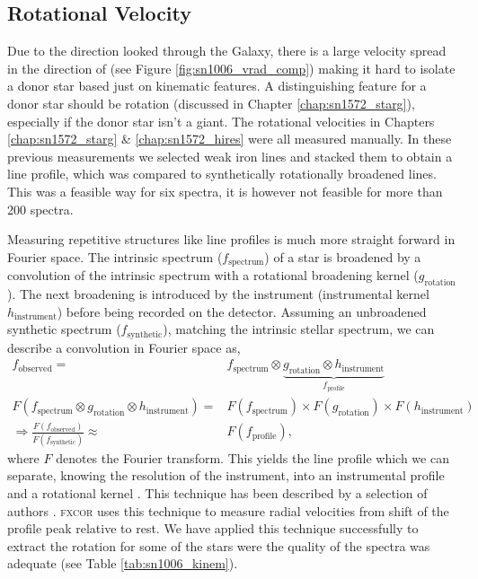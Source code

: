 \subsection{Rotational Velocity}
\label{sec:sn1006_rotvel}
Due to the direction looked through the Galaxy, there is a large velocity spread in the direction of  (see Figure \ref{fig:sn1006_vrad_comp}) making it hard to isolate a \gls{donor} star based just on kinematic features. A distinguishing feature for a \gls{donor} star should be rotation (discussed in Chapter \ref{chap:sn1572_starg}), especially if the donor star isn't a giant. The rotational velocities in Chapters \ref{chap:sn1572_starg} \& \ref{chap:sn1572_hires} were all measured manually. In these previous measurements we selected weak iron lines and stacked them to obtain a line profile, which was compared to synthetically rotationally broadened lines. This was a feasible way for six spectra, it is however not feasible for more than 200 spectra. 

Measuring repetitive structures like line profiles is much more straight forward in Fourier space. The intrinsic spectrum ($f_\textrm{spectrum}$) of a star is broadened by a convolution of the intrinsic spectrum with a rotational broadening kernel ($g_\textrm{rotation}$). The next broadening is introduced by the instrument (instrumental kernel $h_\textrm{instrument}$) before being recorded on the detector. Assuming an unbroadened synthetic spectrum ($f_\textrm{synthetic}$), matching the intrinsic stellar spectrum, we can describe a convolution in Fourier space as,
\begin{align*}
	f_\textrm{observed} =& f_\textrm{spectrum} \otimes \underbrace{g_\textrm{rotation} \otimes h_\textrm{instrument}}_{f_\textrm{profile}}\\
     F(f_\textrm{spectrum} \otimes g_\textrm{rotation} \otimes h_\textrm{instrument}) =& F(f_\textrm{spectrum}) \times F(g_\textrm{rotation}) \times F(h_\textrm{instrument})\\
     \Rightarrow \frac{F(f_\textrm{observed})}{F(f_\textrm{synthetic})} \approx& F(f_\textrm{profile}),
\end{align*}
where $F$ denotes the Fourier transform. This yields the line profile which we can separate, knowing the resolution of the instrument, into an instrumental profile and a rotational kernel . This technique has been described by a selection of authors \citep[e.g.][]{1977ApJ...211..198G}. \textsc{fxcor} uses this technique to measure radial velocities from shift of the profile peak relative to rest. We have applied this technique successfully to extract the rotation for some of the stars were the quality of the spectra was adequate (see Table \ref{tab:sn1006_kinem}).


